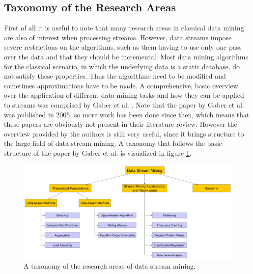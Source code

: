 \subsection{Taxonomy of the Research Areas}
First of all it is useful to note that many research areas in classical data mining are also of interest when processing streams. However, data streams impose severe restrictions on the algorithms, such as them having to use only one pass over the data and that they should be incremental. Most data mining algorithms for the classical scenario, in which the underlying data is a static database, do not satisfy these properties. Thus the algorithms need to be modified and sometimes approximations have to be made. A comprehensive, basic overview over the application of different data mining tasks and how they can be applied to streams was comprised by Gaber et al. \cite{gaber2005mining}. Note that the paper by Gaber et al. was published in 2005, so more work has been done since then, which means that these papers are obviously not present in their literature review. However the overview provided by the authors is still very useful, since it brings structure to the large field of data stream mining. A taxonomy that follows the basic structure of the paper by Gaber et al. is visualized in figure \ref{fig_streamMiningTaxonomy}.

\begin{figure}[h]
	\centering
  	\includegraphics[width=\textwidth]{streamMiningTaxonomy}
	\caption[Data Stream Mining Taxonomy]{A taxonomy of the research areas of data stream mining.}
	\label{fig_streamMiningTaxonomy}
\end{figure}

